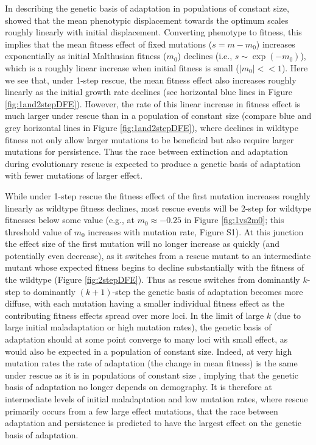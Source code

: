 \documentclass[9pt,twocolumn,twoside,lineno]{gsajnl}
\begin{document}
In describing the genetic basis of adaptation in populations of constant size, \cite{Orr1998} showed that the mean phenotypic displacement towards the optimum scales roughly linearly with initial displacement.
Converting phenotype to fitness, this implies that the mean fitness effect of fixed mutations ($s=m-m_0$) increases exponentially as initial Malthusian fitness ($m_0$) declines (i.e., $s \sim \exp(-m_0)$), which is a roughly linear increase when initial fitness is small ($|m_0|<<1$).
Here we see that, under 1-step rescue, the mean fitness effect also increases roughly linearly as the initial growth rate declines (see horizontal blue lines in Figure \ref{fig:1and2stepDFE}).
However, the rate of this linear increase in fitness effect is much larger under rescue than in a population of constant size (compare blue and grey horizontal lines in Figure \ref{fig:1and2stepDFE}), where declines in wildtype fitness not only allow larger mutations to be beneficial but also require larger mutations for persistence.
Thus the race between extinction and adaptation during evolutionary rescue is expected to produce a genetic basis of adaptation with fewer mutations of larger effect.

While under 1-step rescue the fitness effect of the first mutation increases roughly linearly as wildtype fitness declines, most rescue events will be 2-step for wildtype fitnesses below some value (e.g., at $m_0 \approx -0.25$ in Figure \ref{fig:1vs2m0}; this threshold value of $m_0$ increases with mutation rate, Figure S1).
At this junction the effect size of the first mutation will no longer increase as quickly (and potentially even decrease), as it switches from a rescue mutant to an intermediate mutant whose expected fitness begins to decline substantially with the fitness of the wildtype (Figure \ref{fig:2stepDFE}).
Thus as rescue switches from dominantly $k$-step to dominantly $(k+1)$-step the genetic basis of adaptation becomes more diffuse, with each mutation having a smaller individual fitness effect as the contributing fitness effects spread over more loci.
In the limit of large $k$ (due to large initial maladaptation or high mutation rates), the genetic basis of adaptation should at some point converge to many loci with small effect, as would also be expected in a population of constant size.
Indeed, at very high mutation rates the rate of adaptation (the change in mean fitness) is the same under rescue as it is in populations of constant size \citep{anciaux2019population}, implying that the genetic basis of adaptation no longer depends on demography.
It is therefore at intermediate levels of initial maladaptation and low mutation rates, where rescue primarily occurs from a few large effect mutations, that the race between adaptation and persistence is predicted to have the largest effect on the genetic basis of adaptation.
\end{document}
